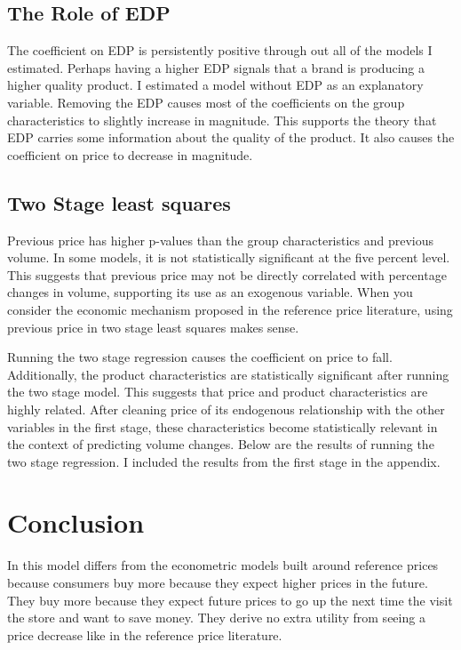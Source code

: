 \documentclass{article}
\begin{document}
\subsection{The Role of EDP}

The coefficient on EDP is persistently positive through out all of the models I estimated. Perhaps having a higher EDP signals that a brand is producing a higher quality product. I estimated a model without EDP as an explanatory variable. Removing the EDP causes most of the coefficients on the group characteristics to slightly increase in magnitude. This supports the theory that EDP carries some information about the quality of the product. It also causes the coefficient on price to decrease in magnitude.


\subsection{Two Stage least squares}

Previous price has higher p-values than the group characteristics and previous volume. In some models, it is not statistically significant at the five percent level. This suggests that previous price may not be directly correlated with percentage changes in volume, supporting its use as an exogenous variable. When you consider the economic mechanism proposed in the reference price literature, using previous price in two stage least squares makes sense.

Running the two stage regression causes the coefficient on price to fall. Additionally, the product characteristics are statistically significant after running the two stage model. This suggests that price and product characteristics are highly related. After cleaning price of its endogenous relationship with the other variables in the first stage, these characteristics become statistically relevant in the context of predicting volume changes. Below are the results of running the two stage regression. I included the results from the first stage in the appendix.

\section{Conclusion}
In this model differs from the econometric models built around reference prices because consumers buy more because they expect higher prices in the future. They buy more because they expect future prices to go up the next time the visit the store and want to save money. They derive no extra utility from seeing a price decrease like in the reference price literature.
\end{document}
